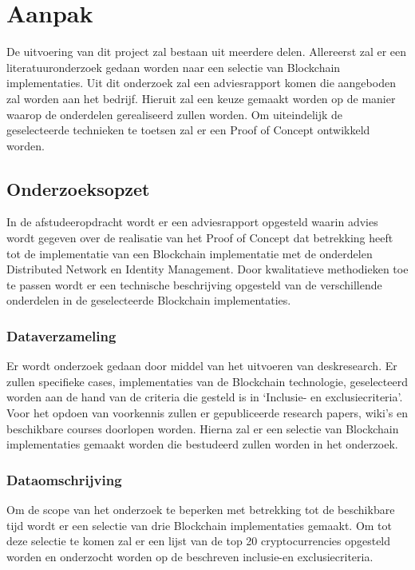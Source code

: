 \chapter{Aanpak}

De uitvoering van dit project zal bestaan uit meerdere delen. Allereerst zal er een literatuuronderzoek gedaan worden naar een selectie van Blockchain implementaties. Uit dit onderzoek zal een adviesrapport komen die aangeboden zal worden aan het bedrijf. Hieruit zal een keuze gemaakt worden op de manier waarop de onderdelen gerealiseerd zullen worden. Om uiteindelijk de geselecteerde technieken te toetsen zal er een Proof of Concept ontwikkeld worden.

\section{Onderzoeksopzet}

In de afstudeeropdracht wordt er een adviesrapport opgesteld waarin advies wordt gegeven over de realisatie van het Proof of Concept dat betrekking heeft tot de implementatie van een Blockchain implementatie met de onderdelen Distributed Network en Identity Management. Door kwalitatieve methodieken toe te passen wordt er een technische beschrijving opgesteld van de verschillende onderdelen in de geselecteerde Blockchain implementaties. 

\subsection{Dataverzameling}

Er wordt onderzoek gedaan door middel van het uitvoeren van deskresearch. Er zullen specifieke cases, implementaties van de Blockchain technologie, geselecteerd worden aan de hand van de criteria die gesteld is in ‘Inclusie- en exclusiecriteria’. Voor het opdoen van voorkennis zullen er gepubliceerde research papers, wiki’s en beschikbare courses doorlopen worden. Hierna zal er een selectie van Blockchain implementaties gemaakt worden die bestudeerd zullen worden in het onderzoek.

\subsection{Dataomschrijving}

Om de scope van het onderzoek te beperken met betrekking tot de beschikbare tijd wordt er een selectie van drie Blockchain implementaties gemaakt. Om tot deze selectie te komen zal er een lijst van de top 20 cryptocurrencies opgesteld worden en onderzocht worden op de beschreven inclusie-en exclusiecriteria. 

